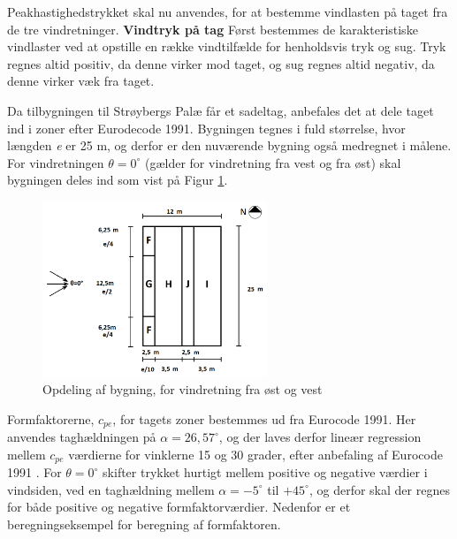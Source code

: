 Peakhastighedstrykket skal nu anvendes, for at bestemme vindlasten på taget fra de tre vindretninger.
\newline
\newline
\textbf{Vindtryk på tag}
\newline
Først bestemmes de karakteristiske vindlaster ved at opstille en række vindtilfælde for henholdsvis tryk og sug. Tryk regnes altid positiv, da denne virker mod taget, og sug regnes altid negativ, da denne virker væk fra taget.


Da tilbygningen til Strøybergs Palæ får et sadeltag, anbefales det at dele taget ind i zoner efter Eurodecode 1991. Bygningen tegnes i fuld størrelse, hvor længden \textit{e} er 25 m, og derfor er den nuværende bygning også medregnet i målene. For vindretningen $\theta = 0^{\circ}$ (gælder for vindretning fra vest og fra øst) skal bygningen deles ind som vist på Figur \ref{fig:opdeling}.  

\begin{figure}[htbp]
	\centering
	\includegraphics[width=0.6\textwidth]{billeder/opdeling.png}
	\caption{Opdeling af bygning, for vindretning fra øst og vest \citep[ kapitel 7.2.5]{EU91}}
	\label{fig:opdeling}
\end{figure}

Formfaktorerne, $c_{pe}$, for tagets zoner bestemmes ud fra Eurocode 1991. Her anvendes taghældningen på $\alpha = 26,\!57^{\circ}$, og der laves derfor lineær regression mellem $c_{pe}$ værdierne for vinklerne 15 og 30 grader, efter anbefaling af Eurocode 1991 \citep[ tabel 7.4a kapitel 7.2.5]{EU91}. For $\theta = 0^{\circ}$ skifter trykket hurtigt mellem positive og negative værdier i vindsiden, ved en taghældning mellem $\alpha = -5^{\circ}$ til $+ 45^{\circ}$, og derfor skal der regnes for både positive og negative formfaktorværdier. 
\newline \indent{     }  Nedenfor er et beregningseksempel for beregning af formfaktoren.


